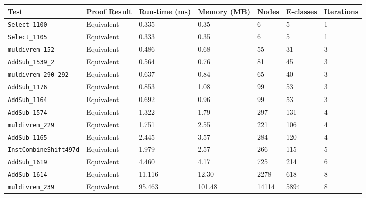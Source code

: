 \begin{tabular}{lllllll}
\toprule
\textbf{Test} & \textbf{Proof Result} & \textbf{Run-time (ms)} & \textbf{Memory (MB)} & \textbf{Nodes} & \textbf{E-classes} & \textbf{Iterations} \\
\midrule
\texttt{Select\_1100} & Equivalent & 0.335 & 0.35 & 6 & 5 & 1 \\
\texttt{Select\_1105} & Equivalent & 0.333 & 0.35 & 6 & 5 & 1 \\
\texttt{muldivrem\_152} & Equivalent & 0.486 & 0.68 & 55 & 31 & 3 \\
\texttt{AddSub\_1539\_2} & Equivalent & 0.564 & 0.76 & 81 & 45 & 3 \\
\texttt{muldivrem\_290\_292} & Equivalent & 0.637 & 0.84 & 65 & 40 & 3 \\
\texttt{AddSub\_1176} & Equivalent & 0.853 & 1.08 & 99 & 53 & 3 \\
\texttt{AddSub\_1164} & Equivalent & 0.692 & 0.96 & 99 & 53 & 3 \\
\texttt{AddSub\_1574} & Equivalent & 1.322 & 1.79 & 297 & 131 & 4 \\
\texttt{muldivrem\_229} & Equivalent & 1.751 & 2.55 & 221 & 106 & 4 \\
\texttt{AddSub\_1165} & Equivalent & 2.445 & 3.57 & 284 & 120 & 4 \\
\texttt{InstCombineShift497d} & Equivalent & 1.979 & 2.57 & 266 & 115 & 5 \\
\texttt{AddSub\_1619} & Equivalent & 4.460 & 4.17 & 725 & 214 & 6 \\
\texttt{AddSub\_1614} & Equivalent & 11.116 & 12.30 & 2278 & 618 & 8 \\
\texttt{muldivrem\_239} & Equivalent & 95.463 & 101.48 & 14114 & 5894 & 8 \\
\bottomrule
\end{tabular}
